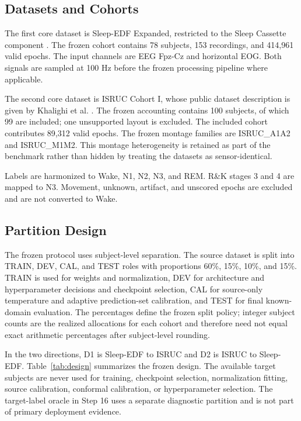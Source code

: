 \documentclass[10pt,twocolumn]{article}
\begin{document}
\subsection{Datasets and Cohorts}
The first core dataset is Sleep-EDF Expanded, restricted to the Sleep Cassette component \citep{imtiaz2015sleepedf}. The frozen cohort contains 78 subjects, 153 recordings, and 414,961 valid epochs. The input channels are EEG Fpz-Cz and horizontal EOG. Both signals are sampled at 100 Hz before the frozen processing pipeline where applicable.

The second core dataset is ISRUC Cohort I, whose public dataset description is given by Khalighi et al. \citep{khalighi2016isruc}. The frozen accounting contains 100 subjects, of which 99 are included; one unsupported layout is excluded. The included cohort contributes 89,312 valid epochs. The frozen montage families are ISRUC\_A1A2 and ISRUC\_M1M2. This montage heterogeneity is retained as part of the benchmark rather than hidden by treating the datasets as sensor-identical.

Labels are harmonized to Wake, N1, N2, N3, and REM. R\&K stages 3 and 4 are mapped to N3. Movement, unknown, artifact, and unscored epochs are excluded and are not converted to Wake.

\subsection{Partition Design}
The frozen protocol uses subject-level separation. The source dataset is split into TRAIN, DEV, CAL, and TEST roles with proportions 60\%, 15\%, 10\%, and 15\%. TRAIN is used for weights and normalization, DEV for architecture and hyperparameter decisions and checkpoint selection, CAL for source-only temperature and adaptive prediction-set calibration, and TEST for final known-domain evaluation. The percentages define the frozen split policy; integer subject counts are the realized allocations for each cohort and therefore need not equal exact arithmetic percentages after subject-level rounding.

In the two directions, D1 is Sleep-EDF to ISRUC and D2 is ISRUC to Sleep-EDF. Table~\ref{tab:design} summarizes the frozen design. The available target subjects are never used for training, checkpoint selection, normalization fitting, source calibration, conformal calibration, or hyperparameter selection. The target-label oracle in Step 16 uses a separate diagnostic partition and is not part of primary deployment evidence.
\end{document}
